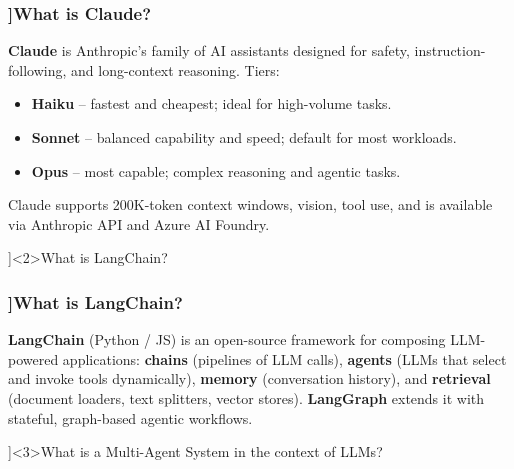 \begin{frame}[fragile]
  \frametitle{\AnswerTitle[\CategoryBadge[AiToolColor!20]{AI Tools \& LLMs}]{What is Claude?}}

  {\footnotesize
  \textbf{Claude} is Anthropic's family of AI assistants designed for safety, instruction-following, and long-context reasoning. Tiers:
  \begin{itemize}
    \item \textbf{Haiku} – fastest and cheapest; ideal for high-volume tasks.
    \item \textbf{Sonnet} – balanced capability and speed; default for most workloads.
    \item \textbf{Opus} – most capable; complex reasoning and agentic tasks.
  \end{itemize}
  Claude supports 200K-token context windows, vision, tool use, and is available via Anthropic API and Azure AI Foundry.
  }
\end{frame}

\QuestionSlide[\CategoryBadge[AiToolColor!20]{AI Tools \& LLMs}]<2>{What is LangChain?}

\begin{frame}[fragile]
  \frametitle{\AnswerTitle[\CategoryBadge[AiToolColor!20]{AI Tools \& LLMs}]{What is LangChain?}}

  {\footnotesize
  \textbf{LangChain} (Python / JS) is an open-source framework for composing LLM-powered applications: \textbf{chains} (pipelines of LLM calls), \textbf{agents} (LLMs that select and invoke tools dynamically), \textbf{memory} (conversation history), and \textbf{retrieval} (document loaders, text splitters, vector stores). \textbf{LangGraph} extends it with stateful, graph-based agentic workflows.
  }
\end{frame}

\QuestionSlide[\CategoryBadge[AiToolColor!20]{AI Tools \& LLMs}]<3>{What is a Multi-Agent System in the context of LLMs?}

